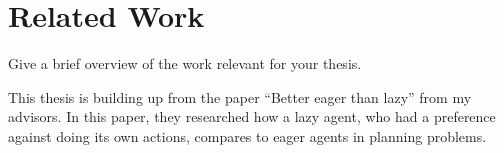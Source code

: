 \chapter{Related Work}\label{chap:relatedwork}
Give a brief overview of the work relevant for your thesis.

This thesis is building up from the paper ``Better eager than lazy'' \cite{bolander2018better} from my advisors. In this paper, they researched how a lazy agent, who had a preference against doing its own actions, compares to eager agents in planning problems.
